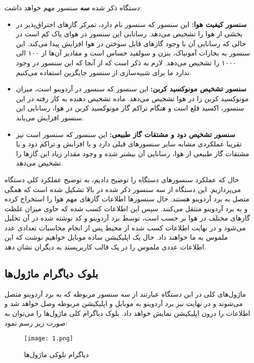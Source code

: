 دستگاه ذکر شده 
\textbf{سه}
سنسور مهم خواهد داشت:

\begin{itemize}
	\item
	\textbf{سنسور کیفیت هوا:} 
	این سنسور که سنسور
	نام دارد، تمرکز گازهای احتراق‌پذیر در بخشی از هوا را تشخیص می‌دهد. رسانایی این سنسور در هوای پاک کم است در حالی که رسانایی آن با وجود گازهای قابل سوختن در هوا افزایش پیدا می‌کند. این سنسور به بخارات آمونیاک، بنزن و سولفید حساس است و مقادیر آن‌ها از ۱۰۰ الی ۱۰۰۰ 
	را تشخیص می‌دهد. لازم به ذکر است که از آنجا که این سنسور در  وجود ندارد ما برای شبیه‌سازی از سنسور جایگزین استفاده می‌کنیم. 
	
	\item
	\textbf{سنسور تشخیص مونوکسید کربن:}
	این سنسور که سنسور
	در آردوینو است، میزان مونوکسید کربن را در هوا تشخیص می‌دهد. ماده تشخیص دهنده به کار رفته در این سنسور، اکسید قلع است و هنگام تراکم گاز مونوکسید کربن در هوا، رسانایی این سنسور افزایش می‌یابد.
	
	\item
	\textbf{سنسور تشخیص دود و مشتقات گاز طبیعی:}
	این سنسور که سنسور
	است نیز تقریبا عملکردی مشابه سایر سنسور‌های قبلی دارد و با افزایش و تراکم دود و یا مشتقات گاز طبیعی از هوا، رسانایی آن بیشتر شده و وجود مقدار زیاد این گازها را تشخیص می‌دهد.
\end{itemize}

حال که عملکرد سنسور‌های دستگاه را توضیح دادیم، به توضیح عملکرد کلی دستگاه می‌پردازیم. این دستگاه از سه سنسور ذکر شده در بالا تشکیل شده است که همگی متصل به برد آردوینو هستند. حال سنسور‌ها اطلاعات گازهای مهم هوا را استخراج کرده و به برد آردوینو منتقل می‌کنند. سپس این اطلاعات کسب شده که حاوی میزان غلظت گازهای مختلف در هوا
بر حسب 
است،
توسط برد آردوینو و کد نوشته شده در آن تحلیل می‌شود و در نهایت اطلاعات کسب شده از محیط پس از انجام محاسبات تعدادی عدد ملموس به ما خواهند داد. حال یک اپلیکیشن ساده موبایل خواهیم نوشت که این اطلاعات عددی ملموس را در یک قالب کاربرپسند به دیگران نشان دهد.
\subsection{بلوک دیاگرام ماژول‌ها}

ماژول‌های کلی در این دستگاه عبارتند از سه سنسور مربوطه که به برد آردوینو متصل می‌شوند و در نهایت نیز برد آردوینو به موبایل و اپلیکیشن مربوطه وصل خواهد شد و اطلاعات را درون اپلیکیشن نمایش خواهد داد. بلوک دیاگرام کلی ماژول‌ها را می‌توان به صورت زیر رسم نمود: 

\begin{figure}[h!]
	\centering		
	\texttt{[image: 1.png]}
	\caption{دیاگرام بلوکی ماژول‌ها}
	\label{fig:boat1}
\end{figure}

